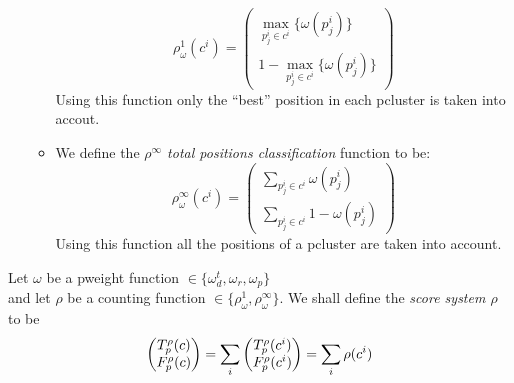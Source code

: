 \documentclass{amsart}
\theoremstyle{definition}
\theoremstyle{remark}
\theoremstyle{definition}
\theoremstyle{remark}
\begin{document}
\begin{itemize}
\begin{itemize}
						\begin{equation*}
							\rho^1_{\omega} (c^i) =	\begin{pmatrix}
																\displaystyle \max_{p^i_j \in c^i} \{\omega (p^i_j) \} \\
																\displaystyle 1 - \max_{p^i_j \in c^i} \{\omega (p^i_j) \}
															\end{pmatrix}
						\end{equation*}
						Using this function only the ``best'' position in each pcluster is taken into accout.
					\item	We define the \emph{$\rho^{\infty}$ total positions classification} function to be: 
					\begin{equation*}						
						\rho^{\infty}_{\omega} (c^i) =
						\begin{pmatrix}
							\displaystyle \sum_{p^i_j \in c^i} \omega (p^i_j) \\
							\displaystyle \sum_{p^i_j \in c^i} 1 - \omega (p^i_j)
						\end{pmatrix}
					\end{equation*}
					Using this function all the positions of a pcluster are taken into account.
				\end{itemize}	
\end{itemize}
Let $\omega$ be a pweight function $\in \{ \omega^t_d , \omega_r , \omega_p \}$ \\
and let $\rho$ be a counting function $\in \{ \rho^1_{\omega} , \rho^{\infty}_{\omega} \}$.
We shall define the \emph{score system $\rho$} to be
\begin{equation*}
	\begin{pmatrix} 
		T_p^{\rho}(c) \\ 
		F_p^{\rho}(c) 
	\end{pmatrix} = 
	\sum_i	\begin{pmatrix} 
		T_p^{\rho}(c^i) \\ 
		F_p^{\rho}(c^i) 
	\end{pmatrix} = 
	\sum_i \rho(c^i) \\
\end{equation*}
\end{document}
